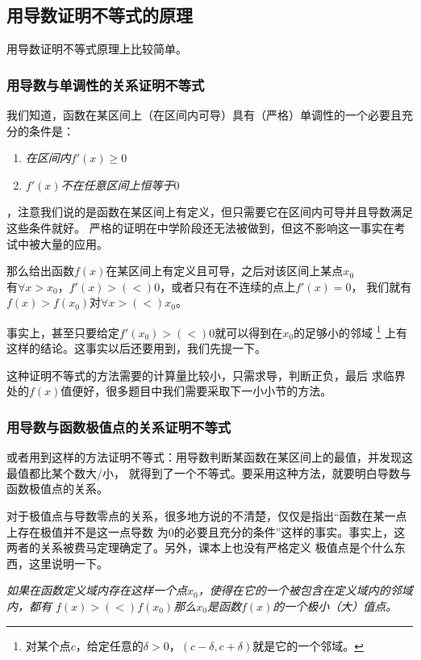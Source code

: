 \subsection{用导数证明不等式的原理}
用导数证明不等式原理上比较简单。

\subsubsection{用导数与单调性的关系证明不等式}
我们知道，函数在某区间上（在区间内可导）具有（严格）单调性的一个必要且充分的条件是：
\begin{enumerate}
\item \emph{在区间内$f'(x)\geq 0$}
\item \emph{$f'(x)$不在任意区间上恒等于$0$}
\end{enumerate}
，注意我们说的是函数在某区间上有定义，但只需要它在区间内可导并且导数满足这些条件就好。
严格的证明在中学阶段还无法被做到，但这不影响这一事实在考试中被大量的应用。

那么给出函数$f(x)$在某区间上有定义且可导，之后对该区间上某点$x_0$\\
有$\forall x > x_0$，$f'(x) >(<) 0$，或者只有在不连续的点上$f'(x)=0$，
我们就有$f(x) > f(x_0)$对$\forall x >(<) x_0$。

事实上，甚至只要给定$f'(x_0) >(<) 0$就可以得到在$x_0$的足够小的邻域
\footnote{对某个点$c$，给定任意的$\delta > 0$，$(c-\delta,c+\delta)$就是它的一个邻域。}
上有这样的结论。这事实以后还要用到，我们先提一下。

这种证明不等式的方法需要的计算量比较小，只需求导，判断正负，最后
求临界处的$f(x)$值便好，很多题目中我们需要采取下一小小节的方法。

\subsubsection{用导数与函数极值点的关系证明不等式}
或者用到这样的方法证明不等式：用导数判断某函数在某区间上的最值，并发现这最值都比某个数大/小，
就得到了一个不等式。要采用这种方法，就要明白导数与函数极值点的关系。

对于极值点与导数零点的关系，很多地方说的不清楚，仅仅是指出``函数在某一点上存在极值并不是这一点导数
为0的必要且充分的条件''这样的事实。事实上，这两者的关系被费马定理确定了。另外，课本上也没有严格定义
极值点是个什么东西，这里说明一下。

{\em 如果在函数定义域内存在这样一个点$x_0$，使得在它的一个被包含在定义域内的邻域内，都有
$f(x) >(<) f(x_0)$那么$x_0$是函数$f(x)$的一个极小（大）值点。}

